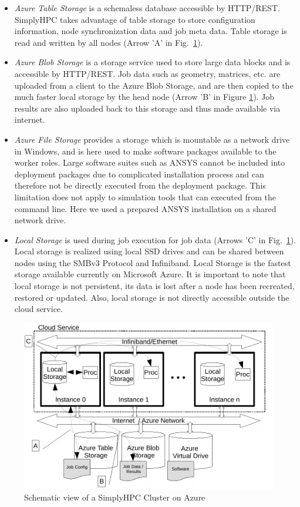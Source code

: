 \documentclass[3p,times]{elsarticle}
\begin{document}
\begin{itemize}

	\item \textit{Azure Table Storage} is a schemaless database accessible by HTTP/REST. SimplyHPC takes advantage of table storage to store configuration information, node synchronization data and job meta data. Table storage is read and written by all nodes (Arrow 'A' in Fig.~\ref{fig:schemaService}).
	
	\item \textit{Azure Blob Storage} is a storage service used to store large data blocks and is accessible by HTTP/REST. Job data such as geometry, matrices, etc. are uploaded from a client to the Azure Blob Storage, and are then copied to the much faster local storage by the head node (Arrow 'B' in Figure \ref{fig:schemaService}). Job results are also uploaded back to this storage and thus made available via internet.	
	
	\item \textit{Azure File Storage} provides a storage which is mountable as a network drive in Windows, and is here used to make software packages available to the worker roles. Large software suites such as ANSYS cannot be included into deployment packages due to complicated installation process and can therefore not be directly executed from the deployment package. This limitation does not apply to simulation tools that can executed from the command line. Here we used a prepared ANSYS installation on a shared network drive.
	
	\item \textit{Local Storage} is used during job execution for job data (Arrows 'C' in Fig.~\ref{fig:schemaService}). Local storage is realized using local SSD drives and can be shared between nodes using the SMBv3 Protocol and Infiniband. Local Storage is the fastest storage available currently on Microsoft Azure. It is important to note that local storage is not persistent, its data is lost after a node has been recreated, restored or updated. Also, local storage is not directly accessible outside the cloud service.

\end{itemize}


\begin{figure}[ht]
	\centering
	\includegraphics[width=.6\linewidth]{azureDeployment.pdf}

	\caption{Schematic view of a SimplyHPC Cluster on Azure}	
	\label{fig:schemaService}
\end{figure}
\end{document}

